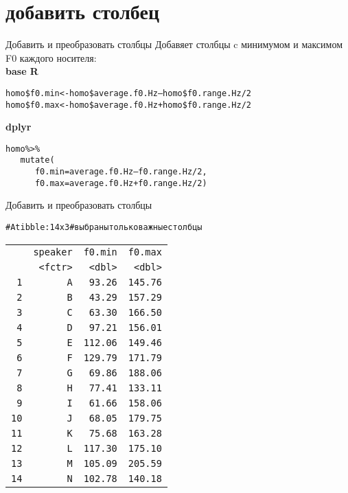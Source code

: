 \section{добавить столбец}
\begin{frame}{Добавить и преобразовать столбцы}
Добавяет столбцы c минимумом и максимом F0 каждого носителя:\bigskip\\
\textbf{base R}
\scriptsize
\begin{alltt}
homo\$f0.min <- homo\$average.f0.Hz – homo\$f0.range.Hz/2\\
homo\$f0.max <- homo\$average.f0.Hz + homo\$f0.range.Hz/2
\bigskip\\
\end{alltt}
\normalsize
\textbf{dplyr}
\scriptsize
\begin{alltt}
homo \alert{\%>\% }\\
\ \ \ \alert{mutate(}\\
\ \ \ \ \ \ f0.min = average.f0.Hz – f0.range.Hz/2, \\
\ \ \ \ \ \ f0.max = average.f0.Hz + f0.range.Hz/2\alert{)}
\end{alltt}
\normalsize
\end{frame}
\begin{frame}{Добавить и преобразовать столбцы}
\scriptsize
\begin{alltt}
\# A tibble: 14 x 3 \hfill \# выбраны только важные столбцы\\
\begin{tabular}{rrrr}
 & speaker & f0.min & f0.max \\ 
 & <fctr> & <dbl> & <dbl> \\ 
1 & A & 93.26 & 145.76 \\ 
2 & B & 43.29 & 157.29 \\ 
3 & C & 63.30 & 166.50 \\ 
4 & D & 97.21 & 156.01 \\ 
5 & E & 112.06 & 149.46 \\ 
6 & F & 129.79 & 171.79 \\ 
7 & G & 69.86 & 188.06 \\ 
8 & H & 77.41 & 133.11 \\ 
9 & I & 61.66 & 158.06 \\ 
10 & J & 68.05 & 179.75 \\ 
11 & K & 75.68 & 163.28 \\ 
12 & L & 117.30 & 175.10 \\ 
13 & M & 105.09 & 205.59 \\ 
14 & N & 102.78 & 140.18 \\ 
\end{tabular}
\end{alltt}
\normalsize
\end{frame}
